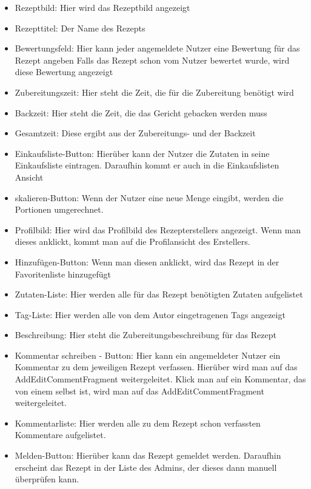\begin{itemize}[nosep]
	\item Rezeptbild: Hier wird das Rezeptbild angezeigt
	\item Rezepttitel: Der Name des Rezepts
	\item Bewertungsfeld: Hier kann jeder angemeldete Nutzer eine Bewertung für das Rezept angeben
	\subitem Falls das Rezept schon vom Nutzer bewertet wurde, wird diese Bewertung angezeigt
	\item Zubereitungszeit: Hier steht die Zeit, die für die Zubereitung benötigt wird
	\item Backzeit: Hier steht die Zeit, die das Gericht gebacken werden muss
	\item Gesamtzeit: Diese ergibt aus der Zubereitungs- und der Backzeit
	\item Einkaufsliste-Button: Hierüber kann der Nutzer die Zutaten in seine Einkaufsliste eintragen. Daraufhin kommt er auch in die Einkaufslisten Ansicht
	\item skalieren-Button: Wenn der Nutzer eine neue Menge eingibt, werden die Portionen umgerechnet.
	\item Profilbild: Hier wird das Profilbild des Rezepterstellers angezeigt. Wenn man dieses anklickt, kommt man auf die Profilansicht des Erstellers.
	\item Hinzufügen-Button: Wenn man diesen anklickt, wird das Rezept in der Favoritenliste hinzugefügt
	\item Zutaten-Liste: Hier werden alle für das Rezept benötigten Zutaten aufgelistet
	\item Tag-Liste: Hier werden alle von dem Autor eingetragenen Tags angezeigt
	\item Beschreibung: Hier steht die Zubereitungsbeschreibung für das Rezept
	\item Kommentar schreiben - Button: Hier kann ein angemeldeter Nutzer ein Kommentar zu dem jeweiligen Rezept verfassen. Hierüber wird man auf das AddEditCommentFragment weitergeleitet. 
	Klick man auf ein Kommentar, das von einem selbst ist, wird man auf das AddEditCommentFragment weitergeleitet. 
	\item Kommentarliste: Hier werden alle zu dem Rezept schon verfassten Kommentare aufgelistet.
	\item Melden-Button: Hierüber kann das Rezept gemeldet werden. Daraufhin erscheint das Rezept in der Liste des Admins, der dieses dann manuell überprüfen kann. 
	
\end{itemize}

